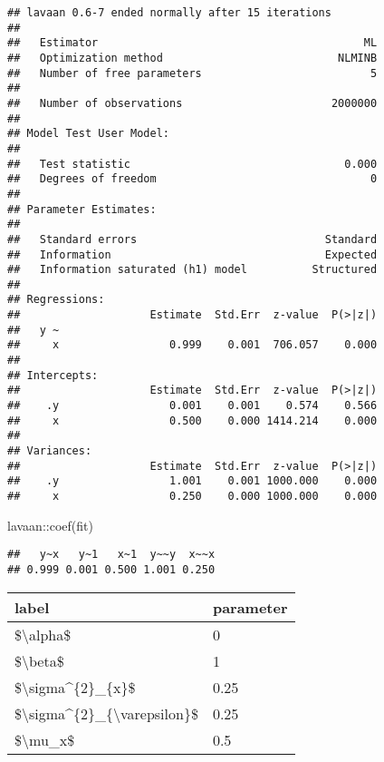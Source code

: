 \documentclass[
]{book}
\newenvironment{Shaded}{\begin{snugshade}}{\end{snugshade}}
\newcommand{\FunctionTok}[1]{\textcolor[rgb]{0.00,0.00,0.00}{#1}}
\newcommand{\NormalTok}[1]{#1}
\newcommand{\SpecialCharTok}[1]{\textcolor[rgb]{0.00,0.00,0.00}{#1}}
\theoremstyle{definition}
\theoremstyle{definition}
\theoremstyle{definition}
\theoremstyle{remark}
\begin{document}
\begin{verbatim}
## lavaan 0.6-7 ended normally after 15 iterations
## 
##   Estimator                                         ML
##   Optimization method                           NLMINB
##   Number of free parameters                          5
##                                                       
##   Number of observations                       2000000
##                                                       
## Model Test User Model:
##                                                       
##   Test statistic                                 0.000
##   Degrees of freedom                                 0
## 
## Parameter Estimates:
## 
##   Standard errors                             Standard
##   Information                                 Expected
##   Information saturated (h1) model          Structured
## 
## Regressions:
##                    Estimate  Std.Err  z-value  P(>|z|)
##   y ~                                                 
##     x                 0.999    0.001  706.057    0.000
## 
## Intercepts:
##                    Estimate  Std.Err  z-value  P(>|z|)
##    .y                 0.001    0.001    0.574    0.566
##     x                 0.500    0.000 1414.214    0.000
## 
## Variances:
##                    Estimate  Std.Err  z-value  P(>|z|)
##    .y                 1.001    0.001 1000.000    0.000
##     x                 0.250    0.000 1000.000    0.000
\end{verbatim}

\begin{Shaded}
\begin{Highlighting}[]
\NormalTok{lavaan}\SpecialCharTok{::}\FunctionTok{coef}\NormalTok{(fit)}
\end{Highlighting}
\end{Shaded}

\begin{verbatim}
##   y~x   y~1   x~1  y~~y  x~~x 
## 0.999 0.001 0.500 1.001 0.250
\end{verbatim}

\begin{tabular}{l|l}
\hline
label & parameter\\
\hline
\$\textbackslash{}alpha\$ & 0\\
\hline
\$\textbackslash{}beta\$ & 1\\
\hline
\$\textbackslash{}sigma\textasciicircum{}\{2\}\_\{x\}\$ & 0.25\\
\hline
\$\textbackslash{}sigma\textasciicircum{}\{2\}\_\{\textbackslash{}varepsilon\}\$ & 0.25\\
\hline
\$\textbackslash{}mu\_x\$ & 0.5\\
\hline
\end{tabular}
\end{document}
